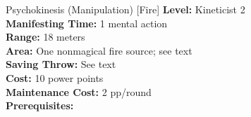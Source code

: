 {Psychokinesis (Manipulation) [Fire]}
{
	\textbf{Level:}
	Kineticist 2\\
	\textbf{Manifesting Time:}
	1 mental action\\
	\textbf{Range:}
	18 meters\\
	\textbf{Area:}
	One nonmagical fire source; see text\\
	\textbf{Saving Throw:}
	See text\\
	\textbf{Cost:}
	10 power points\\
	\textbf{Maintenance Cost:}
	2 pp/round\\
	\textbf{Prerequisites:}
	\\
}
